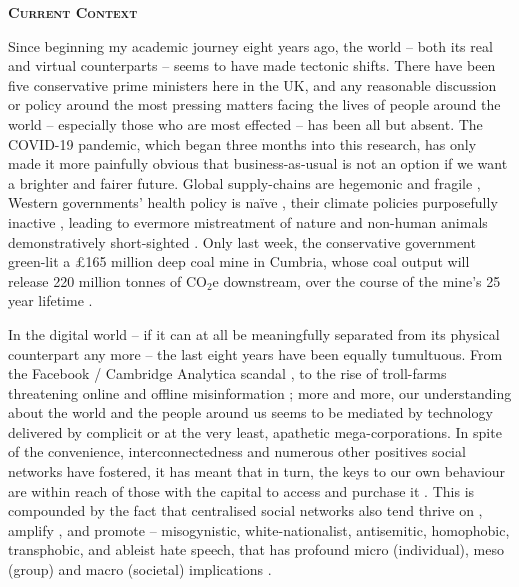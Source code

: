 \newpage
{} %
\begin{flushleft}
	\Huge \textsc{\textbf{Current Context}}
	
\end{flushleft}

\noindent Since beginning my academic journey eight years ago, the world -- both its real and virtual counterparts -- seems to have made tectonic shifts. There have been five conservative prime ministers here in the UK, and any reasonable discussion or policy around the most pressing matters facing the lives of people around the world -- especially those who are most effected -- has been all but absent. The COVID-19 pandemic, which began three months into this research, has only made it more painfully obvious that business-as-usual is not an option if we want a brighter and fairer future. Global supply-chains are hegemonic and fragile \citep{gomez2020}, Western governments' health policy is naïve \citep{navarro2021}, their climate policies purposefully inactive \citep{slawinski2017}, leading to evermore mistreatment of nature and non-human animals demonstratively short-sighted \citep{monbiot2022}. Only last week, the conservative government green-lit a £165 million deep coal mine in Cumbria, whose coal output will release 220 million tonnes of CO$_2$e downstream, over the course of the mine's 25 year lifetime \citep[Grubb and Barrett in][p. 252]{grubb2022}.

In the digital world -- if it can at all be meaningfully separated from its physical counterpart any more -- the last eight years have been equally tumultuous. From the Facebook / Cambridge Analytica scandal \citep{isaak2018}, to the rise of troll-farms threatening online and offline misinformation \citep{badawy2018}; more and more, our understanding about the world and the people around us seems to be mediated by technology delivered by complicit or at the very least, apathetic mega-corporations. In spite of the convenience, interconnectedness and numerous other positives social networks have fostered, it has meant that in turn, the keys to our own behaviour are within reach of those with the capital to access and purchase it \citep{zuboff2019}. This is compounded by the fact that centralised social networks also tend thrive on \citep{thorleifsson2022}, amplify \citep{mathew2019}, and promote \citep{ccdh2022,adl2022}  -- misogynistic, white-nationalist, antisemitic, homophobic, transphobic, and ableist hate speech, that has profound micro (individual), meso (group) and macro (societal) implications \citep{alkiviadou2019}. 

